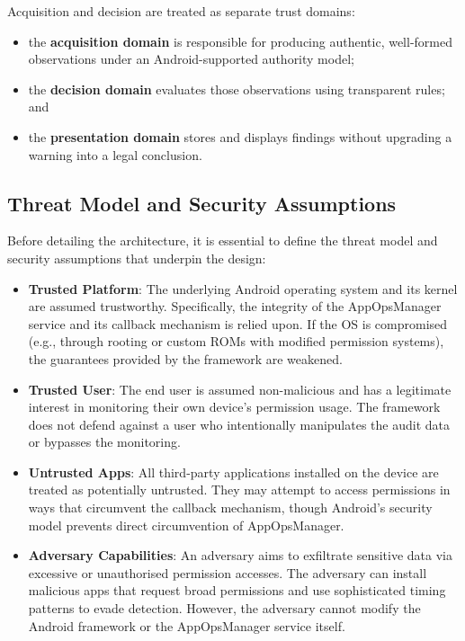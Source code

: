 Acquisition and decision are treated as separate trust domains:
\begin{itemize}
\item the \textbf{acquisition domain} is responsible for producing authentic, well-formed observations under an Android-supported authority model;
\item the \textbf{decision domain} evaluates those observations using transparent rules; and
\item the \textbf{presentation domain} stores and displays findings without upgrading a warning into a legal conclusion.
\end{itemize}

\subsection{Threat Model and Security Assumptions}

Before detailing the architecture, it is essential to define the threat model and security assumptions that underpin the design:

\begin{itemize}
\item \textbf{Trusted Platform}: The underlying Android operating system and its kernel are assumed trustworthy. Specifically, the integrity of the AppOpsManager service and its callback mechanism is relied upon. If the OS is compromised (e.g., through rooting or custom ROMs with modified permission systems), the guarantees provided by the framework are weakened.
\item \textbf{Trusted User}: The end user is assumed non-malicious and has a legitimate interest in monitoring their own device's permission usage. The framework does not defend against a user who intentionally manipulates the audit data or bypasses the monitoring.
\item \textbf{Untrusted Apps}: All third-party applications installed on the device are treated as potentially untrusted. They may attempt to access permissions in ways that circumvent the callback mechanism, though Android's security model prevents direct circumvention of AppOpsManager.
\item \textbf{Adversary Capabilities}: An adversary aims to exfiltrate sensitive data via excessive or unauthorised permission accesses. The adversary can install malicious apps that request broad permissions and use sophisticated timing patterns to evade detection. However, the adversary cannot modify the Android framework or the AppOpsManager service itself.
\end{itemize}

